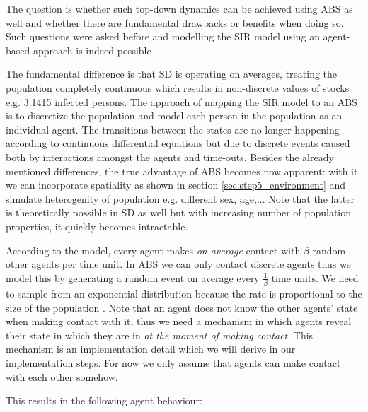 The question is whether such top-down dynamics can be achieved using ABS as well and whether there are fundamental drawbacks or benefits when doing so. Such questions were asked before and modelling the SIR model using an agent-based approach is indeed possible \cite{macal_agent-based_2010}.

The fundamental difference is that SD is operating on averages, treating the population completely continuous which results in non-discrete values of stocks e.g. 3.1415 infected persons. The approach of mapping the SIR model to an ABS is to discretize the population and model each person in the population as an individual agent. The transitions between the states are no longer happening according to continuous differential equations but due to discrete events caused both by interactions amongst the agents and time-outs. Besides the already mentioned differences, the true advantage of ABS becomes now apparent: with it we can incorporate spatiality as shown in section \ref{sec:step5_environment} and simulate heterogenity of population e.g. different sex, age,... Note that the latter is theoretically possible in SD as well but with increasing number of population properties, it quickly becomes intractable. 

According to the model, every agent makes \textit{on average} contact with $\beta$ random other agents per time unit. In ABS we can only contact discrete agents thus we model this by generating a random event on average every $\frac{1}{\beta}$ time units. We need to sample from an exponential distribution because the rate is proportional to the size of the population \cite{borshchev_system_2004}. Note that an agent does not know the other agents' state when making contact with it, thus we need a mechanism in which agents reveal their state in which they are in \textit{at the moment of making contact}. This mechanism is an implementation detail which we will derive in our implementation steps. For now we only assume that agents can make contact with each other somehow.

This results in the following agent behaviour:

